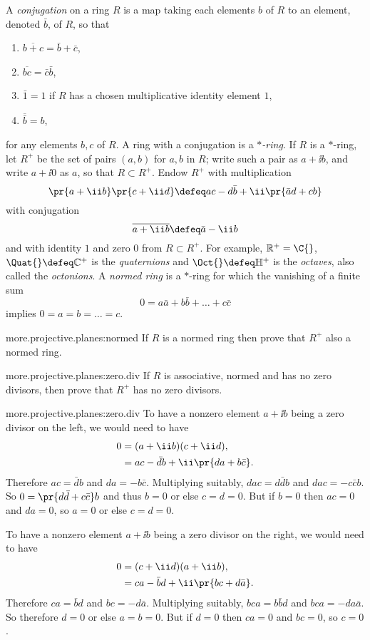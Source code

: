 A \emph{conjugation} on a ring \(R\) is a map taking each elements \(b\) of \(R\) to an element, denoted \(\bar{b}\), of \(R\), so that
\begin{enumerate}
\item \(\overline{b+c}=\bar{b}+\bar{c}\),
\item \(\overline{bc}=\bar{c}\bar{b}\),
\item \(\bar{1}=1\) if \(R\) has a chosen multiplicative identity element \(1\),
\item \(\overline{\bar{b}}=b\),
\end{enumerate}
for any elements \(b,c\) of \(R\).
A ring with a conjugation is a \emph{\(*\)-ring}.
If \(R\) is a \(*\)-ring, let \(R^+\) be the set of pairs \((a,b)\) for \(a,b\) in \(R\); write such a pair as \(a+\ii b\), and write \(a+\ii  0\) as \(a\), so that \(R \subset R^+\).
Endow \(R^+\) with multiplication 
\[
\pr{a+\ii  b}\pr{c + \ii  d}
\defeq
ac-d\bar{b}+\ii \pr{\bar{a}d+cb}
\]
with conjugation 
\[
\overline{a+\ii  b}\defeq\bar{a}-\ii  b
\]
and with identity \(1\) and zero \(0\) from \(R \subset R^+\).
For example, \(\mathbb{R}^+=\C{}\), \(\Quat{}\defeq\mathbb{C}^+\) is the \emph{quaternions} and \(\Oct{}\defeq \mathbb{H}^+\) is the \emph{octaves}, also called the \emph{octonions}.
A \emph{normed ring} is a \(*\)-ring for which the vanishing of a finite sum
\[
0=a\bar{a}+b\bar{b}+\dots+c\bar{c}
\]
implies \(0=a=b=\dots=c\).
\begin{problem}{more.projective.planes:normed}
If \(R\) is a normed ring then prove that \(R^+\) also a normed ring.
\end{problem}
\begin{problem}{more.projective.planes:zero.div}
If \(R\) is associative, normed and has no zero divisors, then prove that \(R^+\) has no zero divisors.
\end{problem}
\begin{answer}{more.projective.planes:zero.div}
To have a nonzero element \(a+\ii b\) being a zero divisor on the left, we would need to have
\begin{align*}
0
&=
(a+\ii b)(c+\ii d),
\\
&=
ac-\bar{d}b+\ii\pr{da+b\bar{c}}.
\end{align*}
Therefore \(ac=\bar{d}b\) and \(da=-b\bar{c}\).
Multiplying suitably, \(dac=d\bar{d}b\) and \(dac=-c\bar{c}b\).
So \(0=\pr{d\bar{d}+c\bar{c}}b\) and thus \(b=0\) or else \(c=d=0\).
But if \(b=0\) then \(ac=0\) and \(da=0\), so \(a=0\) or else \(c=d=0\).

To have a nonzero element \(a+\ii b\) being a zero divisor on the right, we would need to have
\begin{align*}
0
&=
(c+\ii d)(a + \ii b),
\\
&=
ca-\bar{b}d+\ii\pr{bc+d\bar{a}}.
\end{align*}
Therefore \(ca=\bar{b}d\) and \(bc=-d\bar{a}\).
Multiplying suitably, \(bca=b\bar{b}d\) and \(bca=-da\bar{a}\).
So therefore \(d=0\) or else \(a=b=0\).
But if \(d=0\) then \(ca=0\) and \(bc=0\), so \(c=0\).
\end{answer}

